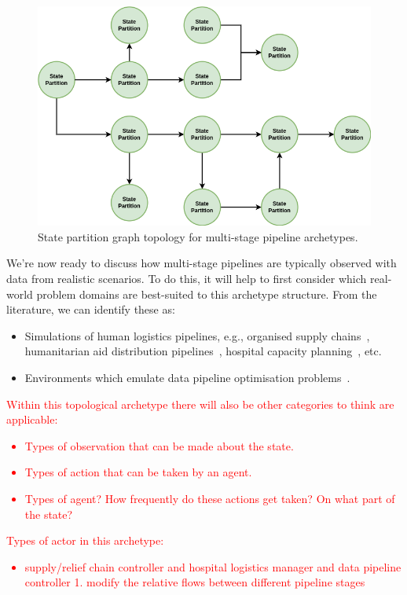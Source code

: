 \begin{figure}[h]
\centering
\includegraphics[width=12cm]{images/chapter-9-state-partition-graph.drawio.png}
\caption{State partition graph topology for multi-stage pipeline archetypes.}
\label{fig:state-partition-graph-multi-stage-pipelines}
\end{figure}

We're now ready to discuss how multi-stage pipelines are typically observed with data from realistic scenarios. To do this, it will help to first consider which real-world problem domains are best-suited to this archetype structure. From the literature, we can identify these as:
\begin{itemize}
\item{Simulations of human logistics pipelines, e.g., organised supply chains~\cite{yan2022reinforcement}, humanitarian aid distribution pipelines~\cite{yu2021reinforcement}, hospital capacity planning~\cite{shuvo2021deep}, etc. }
\item{Environments which emulate data pipeline optimisation problems~\cite{nagrecha2023intune}.}
\end{itemize}

\textcolor{red}{Within this topological archetype there will also be other categories to think are applicable:
\begin{itemize}
\item{Types of observation that can be made about the state.}
\item{Types of action that can be taken by an agent.}
\item{Types of agent? How frequently do these actions get taken? On what part of the state?}
\end{itemize}
}

\textcolor{red}{Types of actor in this archetype:
\begin{itemize}
\item{supply/relief chain controller and hospital logistics manager and data pipeline controller 1. modify the relative flows between different pipeline stages}
\end{itemize}}


